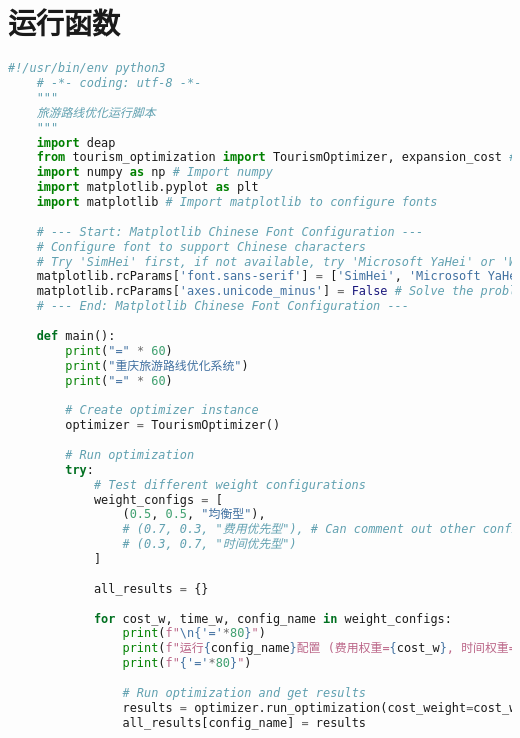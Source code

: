 \section[\hspace{-2pt}运行函数]{{\heiti{} \hspace{-8pt}运行函数}}

\begin{lstlisting}[language=Python]
    #!/usr/bin/env python3
    # -*- coding: utf-8 -*-
    """
    旅游路线优化运行脚本
    """
    import deap
    from tourism_optimization import TourismOptimizer, expansion_cost # Import expansion cost function
    import numpy as np # Import numpy
    import matplotlib.pyplot as plt
    import matplotlib # Import matplotlib to configure fonts
    
    # --- Start: Matplotlib Chinese Font Configuration ---
    # Configure font to support Chinese characters
    # Try 'SimHei' first, if not available, try 'Microsoft YaHei' or 'WenQuanYi Micro Hei'
    matplotlib.rcParams['font.sans-serif'] = ['SimHei', 'Microsoft YaHei', 'Arial Unicode MS'] 
    matplotlib.rcParams['axes.unicode_minus'] = False # Solve the problem of '-' displaying as a square
    # --- End: Matplotlib Chinese Font Configuration ---
    
    def main():
        print("=" * 60)
        print("重庆旅游路线优化系统")
        print("=" * 60)
        
        # Create optimizer instance
        optimizer = TourismOptimizer()
        
        # Run optimization
        try:
            # Test different weight configurations
            weight_configs = [
                (0.5, 0.5, "均衡型"),
                # (0.7, 0.3, "费用优先型"), # Can comment out other configurations for faster expansion analysis
                # (0.3, 0.7, "时间优先型")
            ]
            
            all_results = {}
            
            for cost_w, time_w, config_name in weight_configs:
                print(f"\n{'='*80}")
                print(f"运行{config_name}配置 (费用权重={cost_w}, 时间权重={time_w})")
                print(f"{'='*80}")
                
                # Run optimization and get results
                results = optimizer.run_optimization(cost_weight=cost_w, time_weight=time_w)
                all_results[config_name] = results
                

\end{lstlisting}
